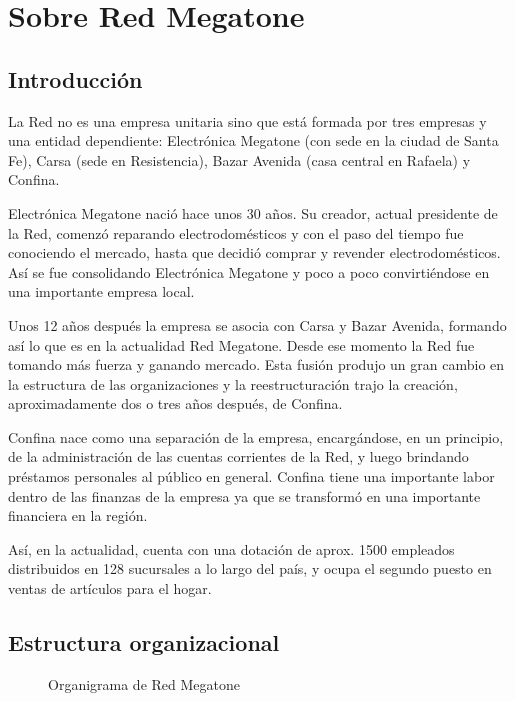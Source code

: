 \section{Sobre Red Megatone}

\subsection{Introducción}
La Red no es una empresa unitaria sino que está formada por tres empresas y una
entidad dependiente: Electrónica Megatone (con sede en la ciudad de Santa Fe),
Carsa (sede en Resistencia), Bazar Avenida (casa central en Rafaela) y Confina.

Electrónica Megatone nació hace unos 30 años. Su creador, actual presidente de
la Red, comenzó reparando electrodomésticos y con el paso del tiempo fue
conociendo el mercado, hasta que decidió comprar y revender electrodomésticos.
Así se fue consolidando Electrónica Megatone y poco a poco convirtiéndose en
una importante empresa local. 

Unos 12 años después la empresa se asocia con Carsa y Bazar Avenida, formando
así lo que es en la actualidad Red Megatone. Desde ese momento la Red fue
tomando más fuerza y ganando mercado. Esta fusión produjo un gran cambio en la
estructura de las organizaciones y la reestructuración trajo la creación,
aproximadamente dos o tres años después, de Confina.

Confina nace como una separación de la empresa, encargándose, en un principio,
de la administración de las cuentas corrientes de la Red, y luego brindando
préstamos personales al público en general. Confina tiene una importante labor
dentro de las finanzas de la empresa ya que se transformó en una importante
financiera en la región.

Así, en la actualidad, cuenta con una dotación de aprox. 1500 empleados
distribuidos en 128 sucursales a lo largo del país, y ocupa el segundo puesto
en ventas de artículos para el hogar.


\subsection{Estructura organizacional}
\begin{figure}[h]
  \caption{Organigrama de Red Megatone}
  \label{fig:organigrama}
\end{figure}

